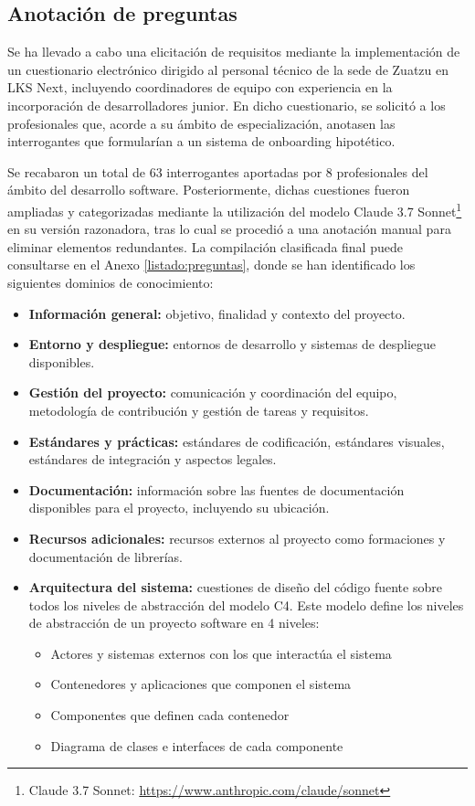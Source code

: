\subsection{Anotación de preguntas}
Se ha llevado a cabo una elicitación de requisitos mediante la implementación de un cuestionario electrónico dirigido al personal técnico de la sede de Zuatzu en LKS Next, incluyendo coordinadores de equipo con experiencia en la incorporación de desarrolladores junior. En dicho cuestionario, se solicitó a los profesionales que, acorde a su ámbito de especialización, anotasen las interrogantes que formularían a un sistema de onboarding hipotético.

Se recabaron un total de 63 interrogantes aportadas por 8 profesionales del ámbito del desarrollo software. Posteriormente, dichas cuestiones fueron ampliadas y categorizadas mediante la utilización del modelo Claude 3.7 Sonnet\footnote{Claude 3.7 Sonnet: \url{https://www.anthropic.com/claude/sonnet}} en su versión razonadora, tras lo cual se procedió a una anotación manual para eliminar elementos redundantes. La compilación clasificada final puede consultarse en el Anexo \ref{listado:preguntas}, donde se han identificado los siguientes dominios de conocimiento:

\begin{itemize}
\item\textbf{Información general: }objetivo, finalidad y contexto del proyecto.
\item\textbf{Entorno y despliegue: }entornos de desarrollo y sistemas de despliegue disponibles.
\item\textbf{Gestión del proyecto: }comunicación y coordinación del equipo, metodología de contribución y gestión de tareas y requisitos.
\item\textbf{Estándares y prácticas: }estándares de codificación, estándares visuales, estándares de integración y aspectos legales.
\item\textbf{Documentación: }información sobre las fuentes de documentación disponibles para el proyecto, incluyendo su ubicación.
\item\textbf{Recursos adicionales: }recursos externos al proyecto como formaciones y documentación de librerías.
\item\textbf{Arquitectura del sistema: }cuestiones de diseño del código fuente sobre todos los niveles de abstracción del modelo C4\cite{noauthor_c4_nodate}. Este modelo define los niveles de abstracción de un proyecto software en 4 niveles:
\begin{itemize}
\item Actores y sistemas externos con los que interactúa el sistema
\item Contenedores y aplicaciones que componen el sistema
\item Componentes que definen cada contenedor
\item Diagrama de clases e interfaces de cada componente
\end{itemize}
\end{itemize}

